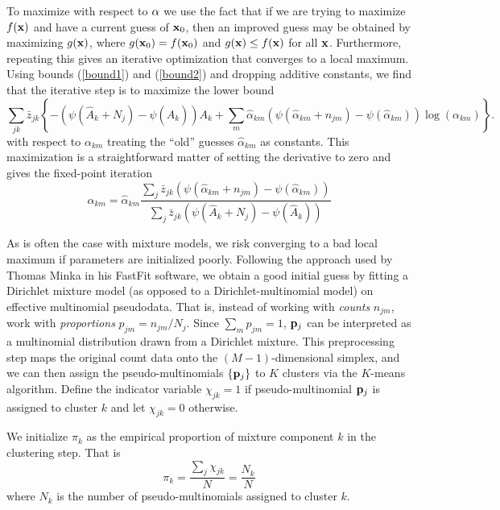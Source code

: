 \documentclass[nofootinbib,amssymb,amsmath]{revtex4}
\begin{document}
To maximize with respect to ${\bf \alpha}$ we use the fact that if we are trying to maximize $f({\bf x})$ and have a current guess of ${{\bf x}_0}$, then an improved guess may be obtained by maximizing $g({\bf x})$, where $g({\bf x}_0) = f({\bf x}_0)$ and $g({\bf x}) \le f({\bf x})$ for all ${\bf x}$.  Furthermore, repeating this gives an iterative optimization that converges to a local maximum.  Using bounds (\ref{bound1}) and (\ref{bound2}) and dropping additive constants, we find that the iterative step is to maximize the lower bound
\begin{equation}
\sum_{jk}  \bar{z}_{jk} \left\{ - \left( \psi(\hat{A}_k + N_j) - \psi(\hat{A}_k) \right) A_k + \sum_m \hat{\alpha}_{km}  \left( \psi(\hat{\alpha}_{km}  + n_{jm}) - \psi(\hat{\alpha}_{km}) \right)  \log(\alpha_{km} )   \right\}.
\end{equation}
with respect to $\alpha_{km}$ treating the ``old'' guesses $\hat{\alpha}_{km}$ as constants.  This maximization is a straightforward matter of setting the derivative to zero and gives the fixed-point iteration
\begin{equation}
\label{DMMiteration}
\alpha_{km} = \hat{\alpha}_{km} \frac{\sum_j \bar{z}_{jk}  \left( \psi(\hat{\alpha}_{km}  + n_{jm}) - \psi(\hat{\alpha}_{km}) \right)} {\sum_j \bar{z}_{jk} \left( \psi(\hat{A}_k + N_j) - \psi(\hat{A}_k) \right)}
\end{equation}

As is often the case with mixture models, we risk converging to a bad local maximum if parameters are initialized poorly.  Following the approach used by Thomas Minka in his FastFit software, we obtain a good initial guess by fitting a Dirichlet mixture model (as opposed to a Dirichlet-multinomial model) on effective multinomial pseudodata.  That is, instead of working with \textit{counts} $n_{jm}$, work with \textit{proportions} $p_{jm} = n_{jm} / N_j$.  Since $\sum_m p_{jm} = 1$, ${\bf p}_j$ can be interpreted as a multinomial distribution drawn from a Dirichlet mixture.  This preprocessing step maps the original count data onto the $(M-1)$-dimensional simplex, and we can then assign the pseudo-multinomials $\{ {\bf p}_j \}$ to $K$ clusters via the $K$-means algorithm.  Define the indicator variable $\chi_{jk} = 1$ if pseudo-multinomial ${\bf p}_j$ is assigned to cluster $k$ and let $\chi_{jk} = 0$ otherwise.

We initialize $\pi_k$ as the empirical proportion of mixture component $k$ in the clustering step.  That is
\begin{equation}
\label{DMM_initialize_pi}
\pi_k = \frac{\sum_j \chi_{jk}}{N} = \frac{N_k}{N}
\end{equation}
where $N_k$ is the number of pseudo-multinomials assigned to cluster $k$.
\end{document}
